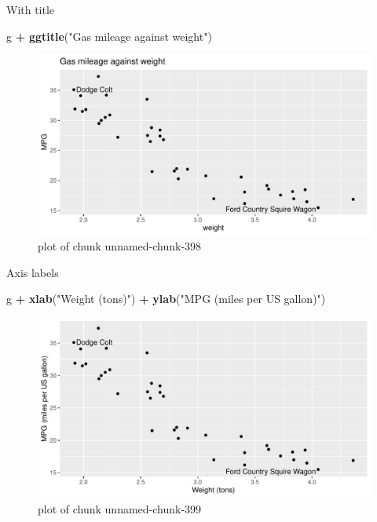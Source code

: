 \documentclass[ignorenonframetext,]{beamer}
\newenvironment{Shaded}{\begin{snugshade}}{\end{snugshade}}
\newcommand{\KeywordTok}[1]{\textcolor[rgb]{0.13,0.29,0.53}{\textbf{#1}}}
\newcommand{\NormalTok}[1]{#1}
\newcommand{\OperatorTok}[1]{\textcolor[rgb]{0.81,0.36,0.00}{\textbf{#1}}}
\newcommand{\StringTok}[1]{\textcolor[rgb]{0.31,0.60,0.02}{#1}}
\begin{document}
\begin{frame}[fragile]{With title}
\protect\hypertarget{with-title}{}

\begin{Shaded}
\begin{Highlighting}[]
\NormalTok{g }\OperatorTok{+}\StringTok{ }\KeywordTok{ggtitle}\NormalTok{(}\StringTok{"Gas mileage against weight"}\NormalTok{)}
\end{Highlighting}
\end{Shaded}

\begin{figure}
\centering
\includegraphics{figure/unnamed-chunk-398-1.pdf}
\caption{plot of chunk unnamed-chunk-398}
\end{figure}

\end{frame}

\begin{frame}[fragile]{Axis labels}
\protect\hypertarget{axis-labels}{}

\begin{Shaded}
\begin{Highlighting}[]
\NormalTok{g }\OperatorTok{+}\StringTok{ }\KeywordTok{xlab}\NormalTok{(}\StringTok{"Weight (tons)"}\NormalTok{) }\OperatorTok{+}\StringTok{ }\KeywordTok{ylab}\NormalTok{(}\StringTok{"MPG (miles per US gallon)"}\NormalTok{)}
\end{Highlighting}
\end{Shaded}

\begin{figure}
\centering
\includegraphics{figure/unnamed-chunk-399-1.pdf}
\caption{plot of chunk unnamed-chunk-399}
\end{figure}

\end{frame}
\end{document}
